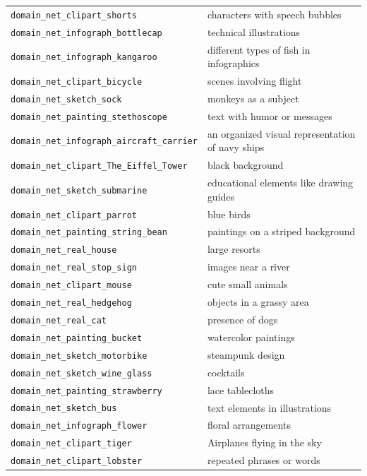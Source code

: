 \documentclass{article} %
\begin{document}
\begin{longtable}{p{} p{}}
\midrule
\texttt{domain\_net\_clipart\_shorts} & characters with speech bubbles \\
\texttt{domain\_net\_infograph\_bottlecap} & technical illustrations \\
\texttt{domain\_net\_infograph\_kangaroo} & different types of fish in infographics \\
\texttt{domain\_net\_clipart\_bicycle} & scenes involving flight \\
\texttt{domain\_net\_sketch\_sock} & monkeys as a subject \\
\texttt{domain\_net\_painting\_stethoscope} & text with humor or messages \\
\texttt{domain\_net\_infograph\_aircraft\_carrier} & an organized visual representation of navy ships \\
\texttt{domain\_net\_clipart\_The\_Eiffel\_Tower} & black background \\
\texttt{domain\_net\_sketch\_submarine} & educational elements like drawing guides \\
\texttt{domain\_net\_clipart\_parrot} & blue birds \\
\texttt{domain\_net\_painting\_string\_bean} & paintings on a striped background \\
\texttt{domain\_net\_real\_house} & large resorts \\
\texttt{domain\_net\_real\_stop\_sign} & images near a river \\
\texttt{domain\_net\_clipart\_mouse} & cute small animals \\
\texttt{domain\_net\_real\_hedgehog} & objects in a grassy area \\
\texttt{domain\_net\_real\_cat} & presence of dogs \\
\texttt{domain\_net\_painting\_bucket} & watercolor paintings \\
\texttt{domain\_net\_sketch\_motorbike} & steampunk design \\
\texttt{domain\_net\_sketch\_wine\_glass} & cocktails \\
\texttt{domain\_net\_painting\_strawberry} & lace tablecloths \\
\texttt{domain\_net\_sketch\_bus} & text elements in illustrations \\
\texttt{domain\_net\_infograph\_flower} & floral arrangements \\
\texttt{domain\_net\_clipart\_tiger} & Airplanes flying in the sky \\
\texttt{domain\_net\_clipart\_lobster} & repeated phrases or words \\

\end{longtable}
\end{document}
